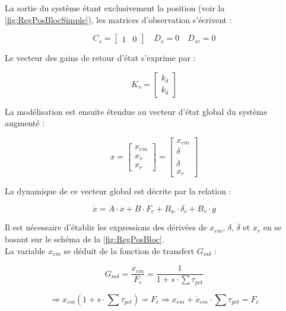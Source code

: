 La sortie du système étant exclusivement la position (voir la \autoref{fig:RegPosBlocSimple}), les matrices d'observation s'écrivent :

\begin{equation}
    C_s = \begin{bmatrix} 1 & 0 \end{bmatrix} \quad D_s =  0 \quad D_{sv} =  0
\end{equation}

Le vecteur des gains de retour d'état s'exprime par :

\begin{equation}
    K_s = \begin{bmatrix} k_\delta \\ k_{\dot{\delta}} \end{bmatrix}
\end{equation}

La modélisation est ensuite étendue au vecteur d'état global du système augmenté :

\begin{equation}
    x = \begin{bmatrix} x_{em} \\ x_s \\ x_r \end{bmatrix} = \begin{bmatrix} x_{em} \\ \delta \\ \dot{\delta} \\ x_r \end{bmatrix}
\end{equation}

La dynamique de ce vecteur global est décrite par la relation :

\begin{equation}
    \dot{x} = A \cdot x + B \cdot F_c + B_w \cdot \delta_c + B_v \cdot g
\end{equation}

Il est nécessaire d'établir les expressions des dérivées de $x_{em}$, $\delta$, $\dot{\delta}$ et $x_r$ en se basant sur le schéma de la \autoref{fig:RegPosBloc}.\\

La variable $x_{em}$ se déduit de la fonction de transfert $G_{m\delta}$ :

$$G_{m\delta} = \frac{x_{em}}{F_c} = \frac{1}{1 + s \cdot \sum\tau_{pct}}$$

$$\Rightarrow x_{em}(1 + s \cdot \sum\tau_{pct}) = F_c \Rightarrow x_{em} + \dot{x}_{em} \cdot \sum\tau_{pct} = F_c$$

